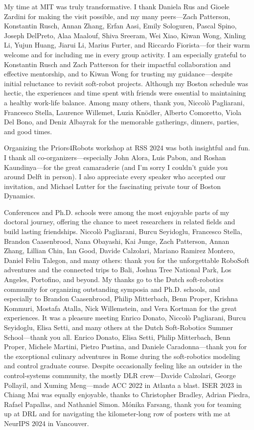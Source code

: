 My time at MIT was truly transformative. I thank Daniela Rus and Gioele Zardini for making the visit possible, and my many peers—Zach Patterson, Konstantin Rusch, Annan Zhang, Erfan Aasi, Emily Sologuren, Pascal Spino, Joseph DelPreto, Alaa Maalouf, Shiva Sreeram, Wei Xiao, Kiwan Wong, Xinling Li, Yujun Huang, Jiarui Li, Marius Furter, and Riccardo Fiorista—for their warm welcome and for including me in every group activity. I am especially grateful to Konstantin Rusch and Zach Patterson for their impactful collaboration and effective mentorship, and to Kiwan Wong for trusting my guidance—despite initial reluctance to revisit soft-robot projects.
Although my Boston schedule was hectic, the experiences and time spent with friends were essential to maintaining a healthy work-life balance. Among many others, thank you, Niccolò Pagliarani, Francesco Stella, Laurence Willemet, Luzia Knödler, Alberto Comoretto, Viola Del Bono, and Deniz Albayrak for the memorable gatherings, dinners, parties, and good times.

Organizing the Priors4Robots workshop at RSS 2024 was both insightful and fun. I thank all co-organizers—especially John Alora, Luis Pabon, and Roshan Kaundinya—for the great camaraderie (and I’m sorry I couldn’t guide you around Delft in person). I also appreciate every speaker who accepted our invitation, and Michael Lutter for the fascinating private tour of Boston Dynamics.

Conferences and Ph.D. schools were among the most enjoyable parts of my doctoral journey, offering the chance to meet researchers in related fields and build lasting friendships. Niccolò Pagliarani, Burcu Seyidoglu, Francesco Stella, Brandon Caasenbrood, Nana Obayashi, Kai Junge, Zach Patterson, Annan Zhang, Lillian Chin, Ian Good, Davide Calzolari, Mariano Ramirez Montero, Daniel Feliu Talegon, and many others: thank you for the unforgettable RoboSoft adventures and the connected trips to Bali, Joshua Tree National Park, Los Angeles, Portofino, and beyond.
My thanks go to the Dutch soft-robotics community for organizing outstanding symposia and Ph.D. schools, and especially to Brandon Caasenbrood, Philip Mitterbach, Benn Proper, Krishna Kommuri, Mostafa Atalla, Nick Willemstein, and Vera Kortman for the great experiences. It was a pleasure meeting Enrico Donato, Niccolò Pagliarani, Burcu Seyidoglu, Elisa Setti, and many others at the Dutch Soft-Robotics Summer School—thank you all.
Enrico Donato, Elisa Setti, Philip Mitterbach, Benn Proper, Michele Martini, Pietro Pustina, and Daniele Caradonna—thank you for the exceptional culinary adventures in Rome during the soft-robotics modeling and control graduate course.
Despite occasionally feeling like an outsider in the control-systems community, the mostly DLR crew—Davide Calzolari, George Pollayil, and Xuming Meng—made ACC 2022 in Atlanta a blast. ISER 2023 in Chiang Mai was equally enjoyable, thanks to Christopher Bradley, Adrian Piedra, Rafael Papallas, and Nathaniel Simon. 
Mónika Farsang, thank you for teaming up at DRL and for navigating the kilometer-long row of posters with me at NeurIPS 2024 in Vancouver.

